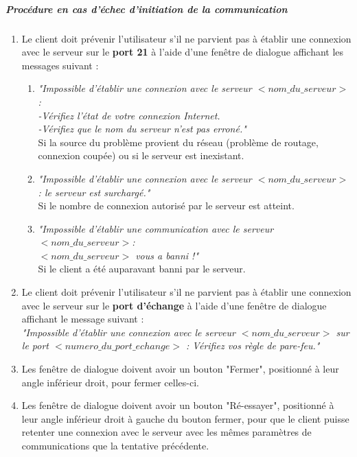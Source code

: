 \documentclass[10pt,a4paper]{report}
\begin{document}
	\subparagraph{Procédure en cas d'échec d'initiation de la communication }

		\begin{enumerate}
			\item Le client doit prévenir l'utilisateur s'il ne parvient pas à établir une connexion avec le serveur sur le \textbf{port 21} à l'aide d'une fenêtre de dialogue affichant les messages suivant : 

			\begin{enumerate}[label=\arabic*.]
				\item \textit{"Impossible d'établir une connexion avec le serveur $< nom\_du\_serveur>$:\\
-Vérifiez l'état de votre connexion Internet.\\
-Vérifiez que le nom du serveur n'est pas erroné."\\}
Si la source du problème provient du réseau (problème de routage, connexion coupée) ou si le serveur est inexistant.

				\item \textit{"Impossible d'établir une connexion avec le serveur $< nom\_du\_serveur>$: le serveur est surchargé."\\}
Si le nombre de connexion autorisé par le serveur est atteint.

				\item \textit{"Impossible d'établir une communication avec le serveur $< nom\_du\_serveur>$:\\
$< nom\_du\_serveur>$ vous a banni !"\\}
Si le client a été auparavant banni par le serveur. 
			\end{enumerate}

			\item Le client doit prévenir l'utilisateur s'il ne parvient pas à établir une connexion avec le serveur sur le \textbf{port d'échange} à l'aide d'une fenêtre de dialogue affichant le message suivant : \\
\textit{"Impossible d'établir une connexion avec le serveur $< nom\_du\_serveur>$ sur le port $< numero\_du\_port\_echange>$ : Vérifiez vos règle de pare-feu."\\}

			\item Les fenêtre de dialogue doivent avoir un bouton "Fermer", positionné à leur angle inférieur droit, pour fermer celles-ci.

			\item Les fenêtre de dialogue doivent avoir un bouton "Ré-essayer", positionné à leur angle inférieur droit à gauche du bouton fermer, pour que le client puisse retenter une connexion avec le serveur avec les mêmes paramètres de communications que la tentative précédente.

		\end{enumerate}
		
\end{document}
